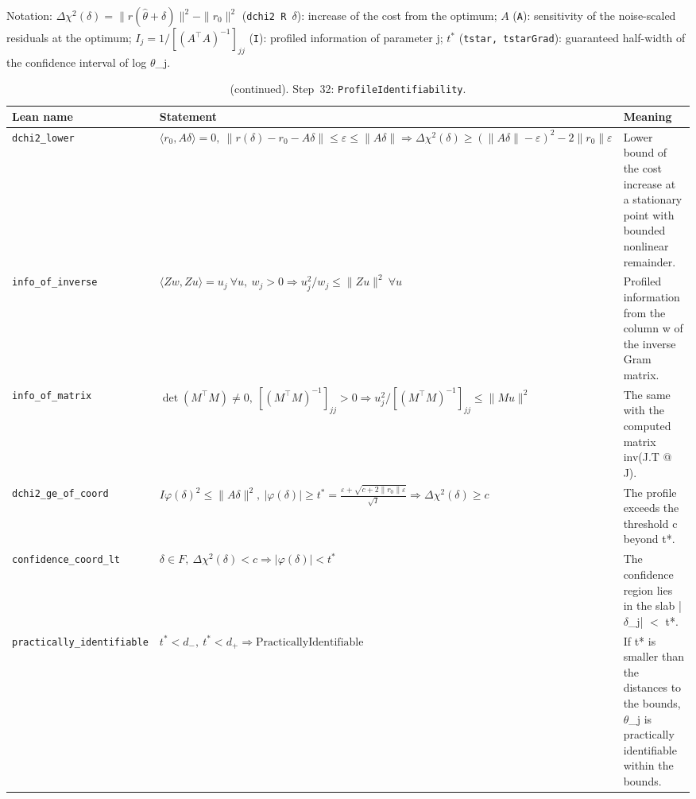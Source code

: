 {\small\raggedright Notation: $\Delta\chi^2(\delta)=\|r(\hat\theta+\delta)\|^2-\|r_0\|^2$ (\texttt{dchi2 R $\delta$}): increase of the cost from the optimum; $A$ (\texttt{A}): sensitivity of the noise-scaled residuals at the optimum; $I_j=1/[(A^{\top}A)^{-1}]_{jj}$ (\texttt{I}): profiled information of parameter j; $t^{\ast}$ (\texttt{tstar, tstarGrad}): guaranteed half-width of the confidence interval of log $\theta$\_j.}

\addtocounter{table}{-1}
{\small
\begin{longtable}{@{}>{\raggedright\arraybackslash}p{3.6cm}>{\raggedright\arraybackslash}p{6.6cm}>{\raggedright\arraybackslash}p{5.6cm}@{}}
\caption[]{(continued). Step~32: \texttt{ProfileIdentifiability}.}\\
\toprule
Lean name & Statement & Meaning \\
\midrule
\endhead
\texttt{dchi2\_\allowbreak{}lower} & $\displaystyle \langle r_0,A\delta\rangle=0,\ \|r(\delta)-r_0-A\delta\|\le\varepsilon\le\|A\delta\|\Rightarrow\Delta\chi^2(\delta)\ge(\|A\delta\|-\varepsilon)^2-2\|r_0\|\varepsilon$ & Lower bound of the cost increase at a stationary point with bounded nonlinear remainder. \\[3pt]
\texttt{info\_\allowbreak{}of\_\allowbreak{}inverse} & $\displaystyle \langle Zw,Zu\rangle=u_j\ \forall u,\ w_j>0\Rightarrow u_j^2/w_j\le\|Zu\|^2\ \forall u$ & Profiled information from the column w of the inverse Gram matrix. \\[3pt]
\texttt{info\_\allowbreak{}of\_\allowbreak{}matrix} & $\displaystyle \det(M^{\top}M)\ne0,\ [(M^{\top}M)^{-1}]_{jj}>0\Rightarrow u_j^2/[(M^{\top}M)^{-1}]_{jj}\le\|Mu\|^2$ & The same with the computed matrix inv(J.T @ J). \\[3pt]
\texttt{dchi2\_\allowbreak{}ge\_\allowbreak{}of\_\allowbreak{}coord} & $\displaystyle I\varphi(\delta)^2\le\|A\delta\|^2,\ |\varphi(\delta)|\ge t^{\ast}=\frac{\varepsilon+\sqrt{c+2\|r_0\|\varepsilon}}{\sqrt I}\Rightarrow\Delta\chi^2(\delta)\ge c$ & The profile exceeds the threshold c beyond t*. \\[3pt]
\texttt{confidence\_\allowbreak{}coord\_\allowbreak{}lt} & $\displaystyle \delta\in F,\ \Delta\chi^2(\delta)<c\Rightarrow|\varphi(\delta)|<t^{\ast}$ & The confidence region lies in the slab |$\delta$\_j| $<$ t*. \\[3pt]
\texttt{practically\_\allowbreak{}identifiable} & $\displaystyle t^{\ast}<d_-,\ t^{\ast}<d_+\Rightarrow\mathrm{PracticallyIdentifiable}$ & If t* is smaller than the distances to the bounds, $\theta$\_j is practically identifiable within the bounds. \\[3pt]

\end{longtable}}
